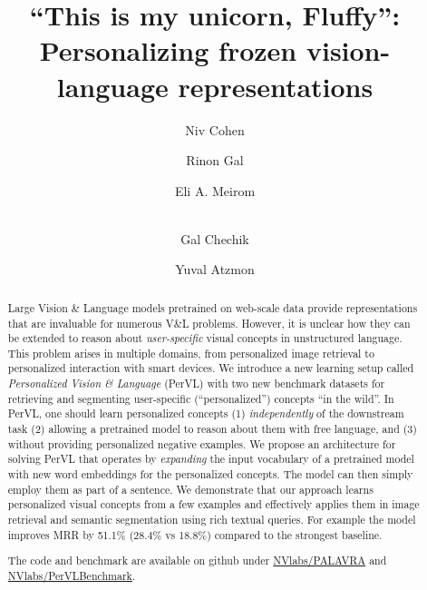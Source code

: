 \documentclass[runningheads]{llncs}
\begin{document}
\pagestyle{headings}
\mainmatter
\def\ECCVSubNumber{8098}  

\title{``This is my unicorn, Fluffy'': Personalizing frozen vision-language representations}





\author{Niv Cohen  \and
Rinon Gal \and
Eli A. Meirom \and \\
Gal Chechik \and
Yuval Atzmon}




\maketitle


\begin{abstract}
Large Vision \& Language models pretrained on web-scale data provide representations that are invaluable for numerous V\&L problems. However, it is unclear how they can be extended to reason about \textit{user-specific} visual concepts in unstructured language. This problem arises in multiple domains, from personalized image retrieval to personalized interaction with smart devices.
We introduce a new learning setup called {\em Personalized Vision \& Language} (PerVL) with two new benchmark datasets for retrieving and segmenting user-specific (``personalized'') concepts ``in the wild''. In PerVL, one should learn personalized concepts (1) {\em independently}  of the downstream task (2) allowing a pretrained model to reason about them with free language, and (3) without providing personalized negative examples.
We propose an architecture for solving PerVL that operates by \textit{expanding} the input vocabulary of a pretrained model with new word embeddings for the  personalized concepts. The model can then simply employ them as part of a sentence.
We demonstrate that our approach learns personalized visual concepts from a few examples and effectively applies them in image retrieval and semantic segmentation using rich textual queries. For example the model improves MRR by 51.1\% (28.4\% vs 18.8\%) compared to the strongest baseline.


The code and benchmark are available on github under \href{https://github.com/NVlabs/PALAVRA}{NVlabs/PALAVRA} and \href{https://github.com/NVlabs/PerVLBenchmark}{NVlabs/PerVLBenchmark}.


\end{abstract}
\end{document}
